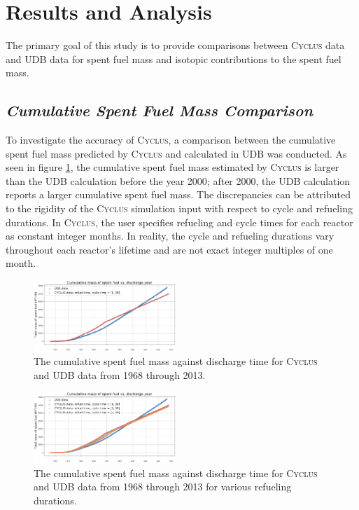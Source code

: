 \documentclass{anstrans}
\newcommand{\Cyclus}{\textsc{Cyclus}\xspace}%
\begin{document}
\section{Results and Analysis}
The primary goal of this study is to provide comparisons between 
\Cyclus data and \gls{UDB} data for spent fuel mass and isotopic contributions to the 
spent fuel mass. 

\subsection{\textit{Cumulative Spent Fuel Mass Comparison}}
To investigate the accuracy of \Cyclus, a comparison between the cumulative spent fuel mass 
predicted by \Cyclus and calculated in \gls{UDB} was conducted. As seen in figure \ref{fig:total_original}, the cumulative spent fuel mass estimated by \Cyclus is larger than the \gls{UDB} calculation before the year 2000; after 2000, the \gls{UDB} calculation reports a larger cumulative spent fuel mass. The discrepancies can be attributed to the rigidity of the \Cyclus simulation input with respect to cycle and 
refueling durations. In \Cyclus, the user specifies refueling and cycle times for each 
reactor as constant integer months.  In reality, the cycle and refueling durations 
vary throughout each reactor's lifetime and are not exact integer multiples of one month. 

\begin{figure}[t] %
	\centering
	\includegraphics[width=0.48\textwidth]{figures/cumulative_mass_udb_cyclus}
	\caption{The cumulative spent fuel mass against discharge time for \Cyclus and \gls{UDB} data from 1968 through 2013.}
	\label{fig:total_original}
\end{figure}

\begin{figure}[t] 
	\centering
	\includegraphics[width=0.48\textwidth]{figures/cumulative_mass_udb_cyclus_refueltime}
	\caption{The cumulative spent fuel mass against discharge time for \Cyclus and \gls{UDB} data from 1968 through 2013 for various refueling durations.}
	\label{fig:total_refueltime}
\end{figure} 
\end{document}
